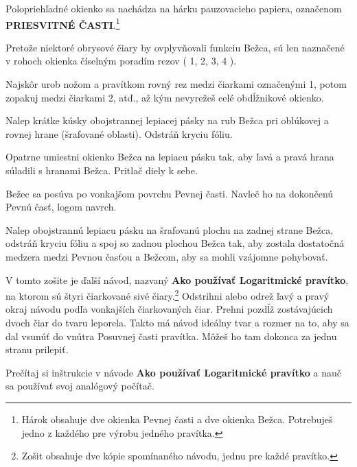 \begin{multicols*}{3}
{  

\footnotesize Polopriehľadné okienko sa nachádza na hárku pauzovacieho papiera, označenom \textbf{PRIESVITNÉ ČASTI}.\footnote{Hárok obsahuje dve okienka Pevnej časti a dve okienka Bežca. Potrebuješ jedno z každého pre výrobu jedného pravítka.}\normalsize

Pretože niektoré obrysové čiary by ovplyvňovali funkciu Bežca, sú len naznačené v rohoch okienka číselným poradím rezov ( 1, 2, 3, 4 ).

Najskôr urob nožom a pravítkom rovný rez medzi čiarkami označenými 1, potom zopakuj medzi čiarkami 2, atď., až kým nevyrežeš celé obdĺžnikové okienko.

Nalep krátke kúsky obojstrannej lepiacej pásky na rub Bežca pri oblúkovej a rovnej hrane (šrafované oblasti). Odstráň kryciu fóliu.

Opatrne umiestni okienko Bežca na  lepiacu pásku tak, aby ľavá a pravá hrana súladili s hranami Bežca. Pritlač diely k sebe.


Bežec sa posúva po vonkajšom povrchu Pevnej časti. Navleč ho na dokončenú Pevnú časť, logom navrch.

Nalep obojstrannú lepiacu pásku na šrafovanú plochu na zadnej strane Bežca, odstráň kryciu fóliu a spoj so zadnou plochou Bežca tak, aby zostala dostatočná medzera medzi Pevnou časťou a Bežcom, aby sa mohli vzájomne pohybovať. 


V tomto zošite je ďalší návod, nazvaný \textbf{Ako používať Logaritmické pravítko}, na ktorom sú štyri čiarkované sivé čiary.\footnote{Zošit obsahuje dve kópie spomínaného návodu, jednu pre každé pravítko.} Odstrihni alebo odrež ľavý a pravý okraj návodu podľa vonkajších čiarkovaných čiar. Prehni pozdĺž zostávajúcich dvoch čiar do tvaru leporela. Takto má návod ideálny tvar a rozmer na to, aby sa dal vsunúť do vnútra Posuvnej časti pravítka. Môžeš ho tam dokonca za jednu stranu prilepiť.


Prečítaj si inštrukcie v návode \textbf{Ako používať Logaritmické pravítko} a nauč sa používať svoj analógový počítač.

  }
  \end{multicols*}
  

